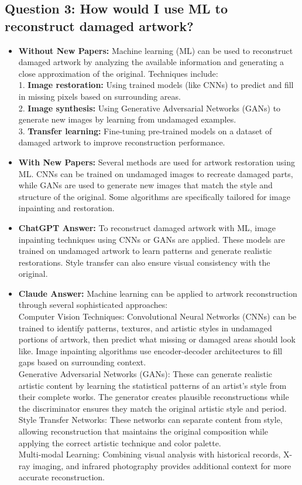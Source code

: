 \documentclass[fleqn,moreauthors,10pt]{ds_report}
\begin{document}
\subsection*{Question 3: How would I use ML to reconstruct damaged artwork?}
\begin{itemize}
  \item \textbf{Without New Papers:}
  Machine learning (ML) can be used to reconstruct damaged artwork by analyzing the available information and generating a close approximation of the original. Techniques include: \\
  1. \textbf{Image restoration:} Using trained models (like CNNs) to predict and fill in missing pixels based on surrounding areas. \\
  2. \textbf{Image synthesis:} Using Generative Adversarial Networks (GANs) to generate new images by learning from undamaged examples. \\
  3. \textbf{Transfer learning:} Fine-tuning pre-trained models on a dataset of damaged artwork to improve reconstruction performance.

  \item \textbf{With New Papers:}
  Several methods are used for artwork restoration using ML. CNNs can be trained on undamaged images to recreate damaged parts, while GANs are used to generate new images that match the style and structure of the original. Some algorithms are specifically tailored for image inpainting and restoration.

  \item \textbf{ChatGPT Answer:}
  To reconstruct damaged artwork with ML, image inpainting techniques using CNNs or GANs are applied. These models are trained on undamaged artwork to learn patterns and generate realistic restorations. Style transfer can also ensure visual consistency with the original.

  \item \textbf{Claude Answer:} 
  Machine learning can be applied to artwork reconstruction through several sophisticated approaches: \\
Computer Vision Techniques: Convolutional Neural Networks (CNNs) can be trained to identify patterns, textures, and artistic styles in undamaged portions of artwork, then predict what missing or damaged areas should look like. Image inpainting algorithms use encoder-decoder architectures to fill gaps based on surrounding context. \\
Generative Adversarial Networks (GANs): These can generate realistic artistic content by learning the statistical patterns of an artist's style from their complete works. The generator creates plausible reconstructions while the discriminator ensures they match the original artistic style and period. \\
Style Transfer Networks: These networks can separate content from style, allowing reconstruction that maintains the original composition while applying the correct artistic technique and color palette.\\
Multi-modal Learning: Combining visual analysis with historical records, X-ray imaging, and infrared photography provides additional context for more accurate reconstruction.



\end{itemize}
\end{document}
